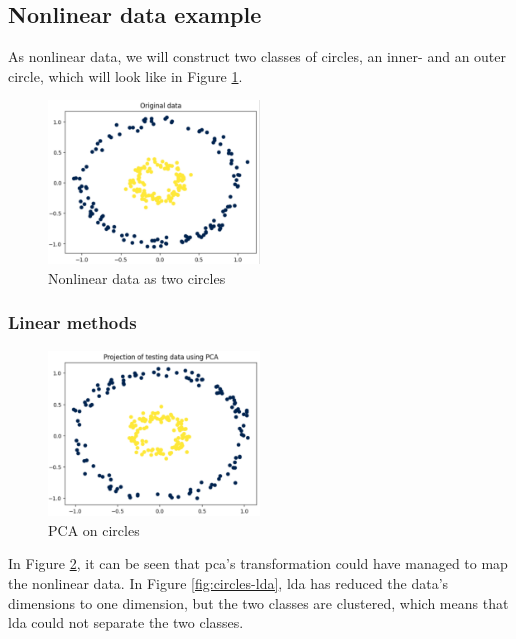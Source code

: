 \subsection{Nonlinear data example}\label{subsec:nonlinear-data-example}
As nonlinear data, we will construct two classes of circles, an inner- and an outer circle, which will look like in Figure \ref{fig:circles}.

\begin{figure}[htb!]
    \centering
    \includegraphics[width=0.5\textwidth]{figures/theory-example-figures/fig-circles.png}
    \caption{Nonlinear data as two circles}
    \label{fig:circles}
    \end{figure}

\subsubsection{Linear methods}\label{subsubsec:linear-methods-on-circles}
\begin{figure}[htb!]
    \centering
    \includegraphics[width=0.5\textwidth]{figures/theory-example-figures/circles-pca.png}
    \caption{PCA on circles}
    \label{fig:circles-pca}
\end{figure}

In Figure \ref{fig:circles-pca}, it can be seen that \gls{pca}'s transformation could have managed to map the nonlinear data. In Figure \ref{fig:circles-lda}, \gls{lda} has reduced the data's dimensions to one dimension, but the two classes are clustered, which means that \gls{lda} could not separate the two classes.

